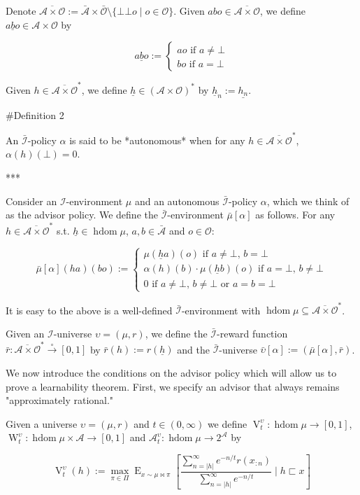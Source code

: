\documentclass[a4paper]{article}
\newcommand{\E}{\operatorname{E}}
\newcommand{\Abs}[1]{\lvert #1 \rvert}
\newcommand{\PF}{\xrightarrow{\circ}}
\newcommand{\Ob}{\mathcal{O}}
\newcommand{\A}{\mathcal{A}}
\newcommand{\I}{\mathcal{I}}
\newcommand{\FH}{(\A \times \Ob)^*}
\newcommand{\Ado}{\bar{\Ob}}
\newcommand{\Ada}{\bar{\A}}
\newcommand{\Adi}{\bar{\I}}
\newcommand{\Adao}{\overline{\A \times \Ob}}
\newcommand{\Adfh}{\Adao^*}
\DeclareMathOperator{\HD}{hdom}
\newcommand{\V}{\operatorname{V}}
\newcommand{\W}{\operatorname{W}}
\begin{document}
Denote $\Adao:= \Ada \times \Ado \setminus \{\bot\bot o \mid o \in \Ob\}$. Given $abo \in \Adao$, we define $\underline{abo} \in \A \times \Ob$ by

$$\underline{abo}:=\begin{cases} ao \text{ if } a\ne\bot \\ bo \text{ if } a=\bot \end{cases}$$

Given $h \in \Adfh$, we define $\underline{h} \in \FH$ by $\underline{h}_n:=\underline{h_n}$. 

\#Definition 2

An $\Adi$-policy $\alpha$ is said to be *autonomous* when for any $h \in \Adfh$, $\alpha(h)(\bot)=0$.

***

Consider an $\I$-environment $\mu$ and an autonomous $\Adi$-policy $\alpha$, which we think of as the advisor policy. We define the $\Adi$-environment $\bar{\mu}[\alpha]$ as follows. For any $h \in \Adfh$ s.t. $\underline{h} \in \HD \mu$, $a,b \in \Ada$ and $o \in \Ob$:

$$\bar{\mu}[\alpha](ha)(bo):=\begin{cases} \mu(\underline{h}a)(o) \text{ if } a\ne\bot,\, b=\bot \\ \alpha(h)(b)\cdot\mu(\underline{h}b)(o) \text{ if } a=\bot,\,b\ne\bot \\ 0 \text{ if } a\ne\bot,\, b\ne\bot \text{ or } a=b=\bot \end{cases}$$

It is easy to the above is a well-defined $\Adi$-environment with $\HD \mu \subseteq \Adfh$. 

Given an $\I$-universe $\upsilon=(\mu,r)$, we define the $\Adi$-reward function $\bar{r}: \Adfh \PF [0,1]$ by $\bar{r}(h):=r(\underline{h})$ and the $\Adi$-universe $\bar{\upsilon}[\alpha]:=(\bar{\mu}[\alpha],\bar{r})$.

We now introduce the conditions on the advisor policy which will allow us to prove a learnability theorem. First, we specify an advisor that always remains "approximately rational."

Given a universe $\upsilon=(\mu,r)$ and $t \in (0, \infty)$ we define $\V_t^\upsilon: \HD{\mu} \rightarrow [0,1]$, $\W_t^\upsilon: \HD{\mu} \times \A \rightarrow [0,1]$ and $\A^\upsilon_t: \HD{\mu} \rightarrow 2^\A$ by

$$\V_t^\upsilon(h):=\max_{\pi \in \Pi} {\E_{x \sim \mu\bowtie\pi}[\frac{\sum_{n=\Abs{h}}^\infty e^{-n/t} r(x_{:n})}{\sum_{n=\Abs{h}}^\infty e^{-n/t}} \mid h \sqsubset x]}$$
\end{document}
